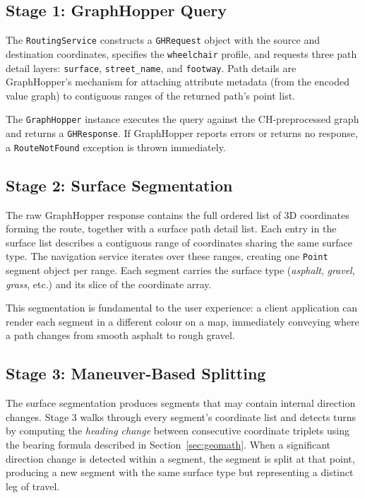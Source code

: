 \documentclass[12pt, a4paper]{report}
\begin{document}
\subsection{Stage 1: GraphHopper Query}
\label{subsec:stage1}

The \texttt{RoutingService} constructs a \texttt{GHRequest} object with the source and destination coordinates, specifies the \texttt{wheelchair} profile, and requests three path detail layers: \texttt{surface}, \texttt{street\_name}, and \texttt{footway}. Path details are GraphHopper's mechanism for attaching attribute metadata (from the encoded value graph) to contiguous ranges of the returned path's point list.

The \texttt{GraphHopper} instance executes the query against the CH-preprocessed graph and returns a \texttt{GHResponse}. If GraphHopper reports errors or returns no response, a \texttt{RouteNotFound} exception is thrown immediately.

\subsection{Stage 2: Surface Segmentation}
\label{subsec:stage2}

The raw GraphHopper response contains the full ordered list of 3D coordinates forming the route, together with a surface path detail list. Each entry in the surface list describes a contiguous range of coordinates sharing the same surface type. The navigation service iterates over these ranges, creating one \texttt{Point} segment object per range. Each segment carries the surface type (\textit{asphalt}, \textit{gravel}, \textit{grass}, etc.) and its slice of the coordinate array.

This segmentation is fundamental to the user experience: a client application can render each segment in a different colour on a map, immediately conveying where a path changes from smooth asphalt to rough gravel.

\subsection{Stage 3: Maneuver-Based Splitting}
\label{subsec:stage3}

The surface segmentation produces segments that may contain internal direction changes. Stage 3 walks through every segment's coordinate list and detects turns by computing the \emph{heading change} between consecutive coordinate triplets using the bearing formula described in Section~\ref{sec:geomath}. When a significant direction change is detected within a segment, the segment is split at that point, producing a new segment with the same surface type but representing a distinct leg of travel.
\end{document}
